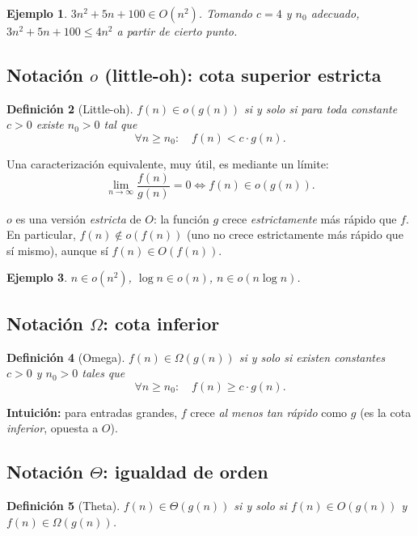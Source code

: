 \documentclass[11pt,a4paper]{article}
\theoremstyle{definicion}
\newtheorem{definicion}{Definición}[section]
\newtheorem{ejemplo}[definicion]{Ejemplo}
\begin{document}
\begin{ejemplo}
$3n^2 + 5n + 100 \in O(n^2)$. Tomando $c = 4$ y $n_0$ adecuado, $3n^2 + 5n + 100 \leq 4n^2$ a partir de cierto punto.
\end{ejemplo}

\subsection{Notación $o$ (little-oh): cota superior estricta}

\begin{definicion}[Little-oh]
$f(n) \in o(g(n))$ si y solo si para \emph{toda} constante $c > 0$ existe $n_0 > 0$ tal que
\[
\forall n \geq n_0 : \quad f(n) < c \cdot g(n).
\]
\end{definicion}

Una caracterización equivalente, muy útil, es mediante un límite:
\[
\lim_{n \to \infty} \frac{f(n)}{g(n)} = 0 \iff f(n) \in o(g(n)).
\]

\begin{intuicion}
$o$ es una versión \emph{estricta} de $O$: la función $g$ crece \emph{estrictamente} más rápido que $f$. En particular, $f(n) \notin o(f(n))$ (uno no crece estrictamente más rápido que sí mismo), aunque sí $f(n) \in O(f(n))$.
\end{intuicion}

\begin{ejemplo}
$n \in o(n^2)$, $\log n \in o(n)$, $n \in o(n \log n)$.
\end{ejemplo}

\subsection{Notación $\Omega$: cota inferior}

\begin{definicion}[Omega]
$f(n) \in \Omega(g(n))$ si y solo si existen constantes $c > 0$ y $n_0 > 0$ tales que
\[
\forall n \geq n_0 : \quad f(n) \geq c \cdot g(n).
\]
\end{definicion}

\textbf{Intuición:} para entradas grandes, $f$ crece \emph{al menos tan rápido} como $g$ (es la cota \emph{inferior}, opuesta a $O$).

\subsection{Notación $\Theta$: igualdad de orden}

\begin{definicion}[Theta]
$f(n) \in \Theta(g(n))$ si y solo si $f(n) \in O(g(n))$ \emph{y} $f(n) \in \Omega(g(n))$.
\end{definicion}
\end{document}
